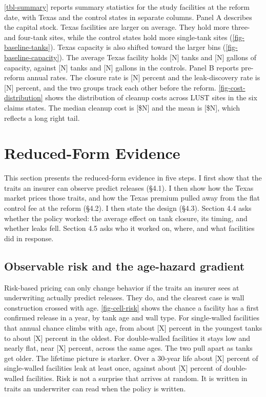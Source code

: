 \documentclass[
  12pt,
]{article}
\begin{document}
\autoref{tbl-summary} reports summary statistics for the study
facilities at the reform date, with Texas and the control states in
separate columns. Panel A describes the capital stock. Texas facilities
are larger on average. They hold more three- and four-tank sites, while
the control states hold more single-tank sites
(\autoref{fig-baseline-tanks}). Texas capacity is also shifted toward
the larger bins (\autoref{fig-baseline-capacity}). The average Texas
facility holds {[}N{]} tanks and {[}N{]} gallons of capacity, against
{[}N{]} tanks and {[}N{]} gallons in the controls. Panel B reports
pre-reform annual rates. The closure rate is {[}N{]} percent and the
leak-discovery rate is {[}N{]} percent, and the two groups track each
other before the reform. \autoref{fig-cost-distribution} shows the
distribution of cleanup costs across LUST sites in the six claims
states. The median cleanup cost is {[}\$N{]} and the mean is {[}\$N{]},
which reflects a long right tail.

\section{Reduced-Form Evidence}\label{reduced-form-evidence}

This section presents the reduced-form evidence in five steps. I first
show that the traits an insurer can observe predict releases (§4.1). I
then show how the Texas market prices those traits, and how the Texas
premium pulled away from the flat control fee at the reform (§4.2). I
then state the design (§4.3). Section 4.4 asks whether the policy
worked: the average effect on tank closure, its timing, and whether
leaks fell. Section 4.5 asks who it worked on, where, and what
facilities did in response.

\subsection{Observable risk and the age-hazard
gradient}\label{observable-risk-and-the-age-hazard-gradient}

Risk-based pricing can only change behavior if the traits an insurer
sees at underwriting actually predict releases. They do, and the
clearest case is wall construction crossed with age.
\autoref{fig-cell-risk} shows the chance a facility has a first
confirmed release in a year, by tank age and wall type. For
single-walled facilities that annual chance climbs with age, from about
{[}X{]} percent in the youngest tanks to about {[}X{]} percent in the
oldest. For double-walled facilities it stays low and nearly flat, near
{[}X{]} percent, across the same ages. The two pull apart as tanks get
older. The lifetime picture is starker. Over a 30-year life about
{[}X{]} percent of single-walled facilities leak at least once, against
about {[}X{]} percent of double-walled facilities. Risk is not a
surprise that arrives at random. It is written in traits an underwriter
can read when the policy is written.
\end{document}
